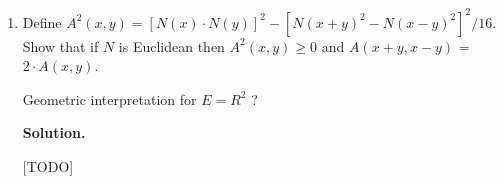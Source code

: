 \documentclass[12pt]{article}
\newenvironment{solution}{\vspace{0.2cm} \textbf{Solution.}}{}
\begin{document}
\begin{enumerate}[label=(\alph*)]
\begin{solution}
		However, \textbf{for} $p \geq 1$ \textbf{but} $p\neq 2$, $N_p$ is not Euclidean.
		As a counterexample, one can consider $x = (1,1,0, \ldots, 0)$ and $y = (1,-1,0,\ldots,0)$. We have $N_p(x) = N_p (y) = \sqrt[p]{2}$ but $N_p (x+y) = N_p (x-y) = 2$. So $N_p ^2 (x+y) + N_p ^2 (x-y) = 8 \neq N_p ^2 (x) + N_p ^2 (y) = 4 \sqrt[\frac{p}{2}]{2}$.
		
		Since it doesn't check the parallelogram identity, $N_p$ is not Euclidean \textbf{for} $p \geq 1$ \textbf{but} $p\neq 2$.
		
		$Q_p$ is not a norm for any $p \in [1, \infty)$ since it doesn't check the triangle inequality: for $x = (1,0,\ldots,0)$ and $y = (0,1,0,\ldots,0)$, we have:
		$$Q_p(x+y)^2 = 2^2 + \frac{1}{p} > Q_p(x)^2 + Q_p(y)^2 = 1^2 + 1^2 = 2$$
		
		A fortiori, it can't be a Euclidean norm.
		
		\end{solution}
		\item Define $A^2 (x, y) = [N(x) \cdot N(y)]^2 - [N(x + y)^2 - N(x - y)^2 ]^2 /16$. Show that if $N$ is Euclidean then
		$A^2 (x, y) \geq 0$ and $A(x + y, x - y)$ = $2 \cdot A(x, y)$.
		
		Geometric interpretation for $E = R^2$ ?
		
		\begin{solution}
		
		[TODO]
		
		\end{solution}
	\end{enumerate}
	
\end{document}
